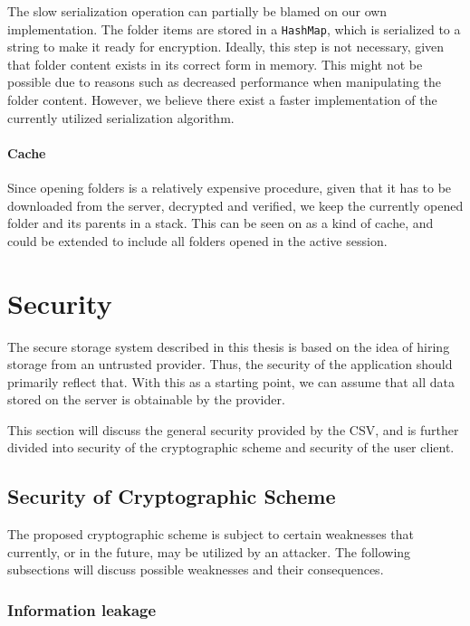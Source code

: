 \documentclass[pdftex,english,10pt,b5paper,twoside]{book}
\begin{document}
The slow serialization operation can partially be blamed on our own
implementation. The folder items are stored in a \texttt{HashMap}, which
is serialized to a string to make it ready for encryption. Ideally, this step
is not necessary, given that folder content exists in its correct form in
memory. This might not be possible due to reasons such as decreased performance
when manipulating the folder content. However, we believe there exist a
faster implementation of the currently utilized serialization algorithm.

\paragraph{Cache} Since opening folders is a relatively expensive procedure,
given that it has to be downloaded from the server, decrypted and verified, we
keep the currently opened folder and its parents in a stack. This can be seen
on as a kind of cache, and could be extended to include all folders opened
in the active session.

\section{Security}

The secure storage system described in this thesis is based on the idea of
hiring storage from an untrusted provider. Thus, the security of the
application should primarily reflect that. With this as a starting point, we
can assume that all data stored on the server is obtainable by the provider.

This section will discuss the general security provided by the \acl{CSV}, and
is further divided into security of the cryptographic scheme and security of
the user client.

\subsection{Security of Cryptographic Scheme}

The proposed cryptographic scheme is subject to certain weaknesses that
currently, or in the future, may be utilized by an attacker. The following
subsections will discuss possible weaknesses and their consequences.

\subsubsection{Information leakage}
\end{document}
